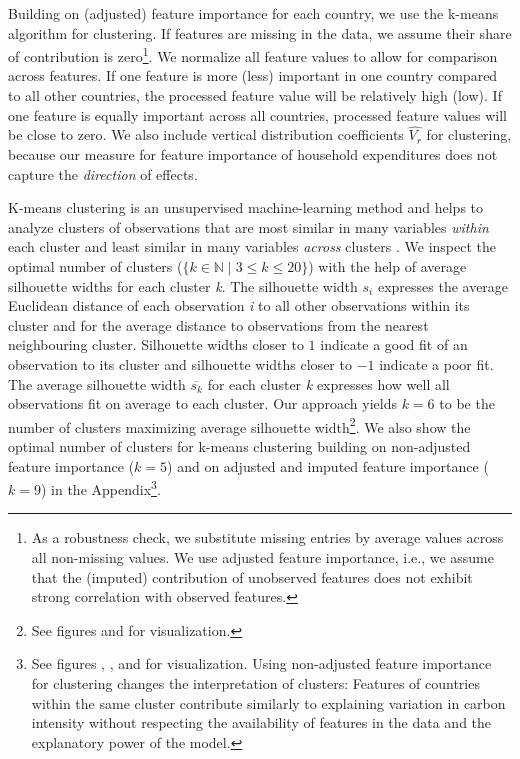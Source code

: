 \documentclass[12pt, a4paper]{article}
\begin{document}
Building on (adjusted) feature importance for each country, we use the k-means algorithm for clustering. If features are missing in the data, we assume their share of contribution is zero\footnote{As a robustness check, we substitute missing entries by average values across all non-missing values. We use adjusted feature importance, i.e., we assume that the (imputed) contribution of unobserved features does not exhibit strong correlation with observed features.}. We normalize all feature values to allow for comparison across features. If one feature is more (less) important in one country compared to all other countries, the processed feature value will be relatively high (low). If one feature is equally important across all countries, processed feature values will be close to zero. We also include vertical distribution coefficients $\widehat{V_{r}}$ for clustering, because our measure for feature importance of household expenditures does not capture the \textit{direction} of effects.

K-means clustering is an unsupervised machine-learning method and helps to analyze clusters of observations that are most similar in many variables \textit{within} each cluster and least similar in many variables \textit{across} clusters \autocite{MacQueen.1967}. We inspect the optimal number of clusters ($\{k \in \mathbb{N} \mid 3  \leq k \leq 20 \}$) with the help of average silhouette widths \autocite{Rousseeuw.1987} for each cluster \textit{k}. The silhouette width $s_{i}$ expresses the average Euclidean distance of each observation \textit{i} to all other observations within its cluster and for the average distance to observations from the nearest neighbouring cluster. Silhouette widths closer to $1$ indicate a good fit of an observation to its cluster and silhouette widths closer to $-1$ indicate a poor fit. The average silhouette width $\overline{s_{k}}$ for each cluster \textit{k} expresses how well all observations fit on average to each cluster. Our approach yields $k = 6$ to be the number of clusters maximizing average silhouette width\footnote{See figures  and  for visualization.}. We also show the optimal number of clusters for k-means clustering building on non-adjusted feature importance ($k = 5$) and on adjusted and imputed feature importance ($k=9$) in the Appendix\footnote{See figures , ,  and  for visualization. Using non-adjusted feature importance for clustering changes the interpretation of clusters: Features of countries within the same cluster contribute similarly to explaining variation in carbon intensity without respecting the availability of features in the data and the explanatory power of the model.}.
\end{document}
